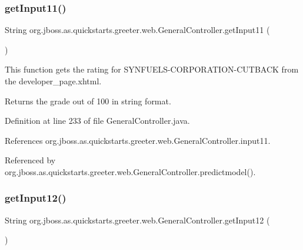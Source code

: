 \subsubsection{\texorpdfstring{get\+Input11()}{getInput11()}}
{\footnotesize\ttfamily String org.\+jboss.\+as.\+quickstarts.\+greeter.\+web.\+General\+Controller.\+get\+Input11 (\begin{DoxyParamCaption}{ }\end{DoxyParamCaption})}



This function gets the rating for S\+Y\+N\+F\+U\+E\+L\+S-\/\+C\+O\+R\+P\+O\+R\+A\+T\+I\+O\+N-\/\+C\+U\+T\+B\+A\+CK from the developer\+\_\+page.\+xhtml. 

\begin{DoxyReturn}{Returns}
the grade out of 100 in string format. 
\end{DoxyReturn}


Definition at line 233 of file General\+Controller.\+java.



References org.\+jboss.\+as.\+quickstarts.\+greeter.\+web.\+General\+Controller.\+input11.



Referenced by org.\+jboss.\+as.\+quickstarts.\+greeter.\+web.\+General\+Controller.\+predictmodel().

\mbox{\label{classorg_1_1jboss_1_1as_1_1quickstarts_1_1greeter_1_1web_1_1_general_controller_a472a7d6dadb7371e32bf945e84f3d12a}} 
\subsubsection{\texorpdfstring{get\+Input12()}{getInput12()}}
{\footnotesize\ttfamily String org.\+jboss.\+as.\+quickstarts.\+greeter.\+web.\+General\+Controller.\+get\+Input12 (\begin{DoxyParamCaption}{ }\end{DoxyParamCaption})}



